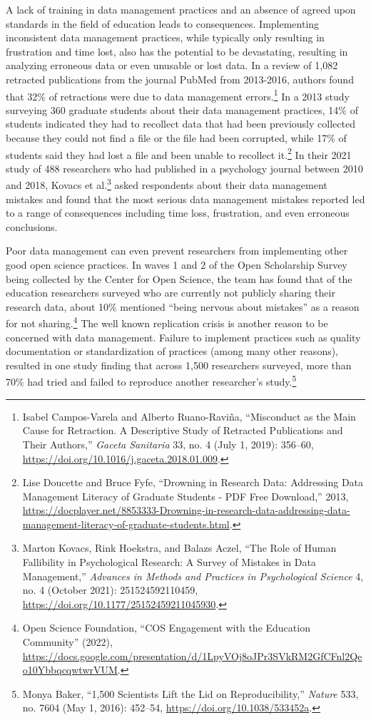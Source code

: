\documentclass[
]{book}
\begin{document}
A lack of training in data management practices and an absence of agreed upon standards in the field of education leads to consequences. Implementing inconsistent data management practices, while typically only resulting in frustration and time lost, also has the potential to be devastating, resulting in analyzing erroneous data or even unusable or lost data. In a review of 1,082 retracted publications from the journal PubMed from 2013-2016, authors found that 32\% of retractions were due to data management errors.\footnote{Isabel Campos-Varela and Alberto Ruano-Raviña, {``Misconduct as the Main Cause for Retraction. A Descriptive Study of Retracted Publications and Their Authors,''} \emph{Gaceta Sanitaria} 33, no. 4 (July 1, 2019): 356--60, \url{https://doi.org/10.1016/j.gaceta.2018.01.009}.} In a 2013 study surveying 360 graduate students about their data management practices, 14\% of students indicated they had to recollect data that had been previously collected because they could not find a file or the file had been corrupted, while 17\% of students said they had lost a file and been unable to recollect it.\footnote{Lise Doucette and Bruce Fyfe, {``Drowning in Research Data: Addressing Data Management Literacy of Graduate Students - {PDF} Free Download,''} 2013, \url{https://docplayer.net/8853333-Drowning-in-research-data-addressing-data-management-literacy-of-graduate-students.html}.} In their 2021 study of 488 researchers who had published in a psychology journal between 2010 and 2018, Kovacs et al.\footnote{Marton Kovacs, Rink Hoekstra, and Balazs Aczel, {``The Role of Human Fallibility in Psychological Research: A Survey of Mistakes in Data Management,''} \emph{Advances in Methods and Practices in Psychological Science} 4, no. 4 (October 2021): 251524592110459, \url{https://doi.org/10.1177/25152459211045930}.} asked respondents about their data management mistakes and found that the most serious data management mistakes reported led to a range of consequences including time loss, frustration, and even erroneous conclusions.

Poor data management can even prevent researchers from implementing other good open science practices. In waves 1 and 2 of the Open Scholarship Survey being collected by the Center for Open Science, the team has found that of the education researchers surveyed who are currently not publicly sharing their research data, about 10\% mentioned ``being nervous about mistakes'' as a reason for not sharing.\footnote{Open Science Foundation, {``{COS} Engagement with the Education Community''} (2022), \url{https://docs.google.com/presentation/d/1LpyVOj8oJPr3SVkRM2GfCFnl2Qeo10YbbqcqwtwrVUM}.} The well known replication crisis is another reason to be concerned with data management. Failure to implement practices such as quality documentation or standardization of practices (among many other reasons), resulted in one study finding that across 1,500 researchers surveyed, more than 70\% had tried and failed to reproduce another researcher's study.\footnote{Monya Baker, {``1,500 Scientists Lift the Lid on Reproducibility,''} \emph{Nature} 533, no. 7604 (May 1, 2016): 452--54, \url{https://doi.org/10.1038/533452a}.}
\end{document}
